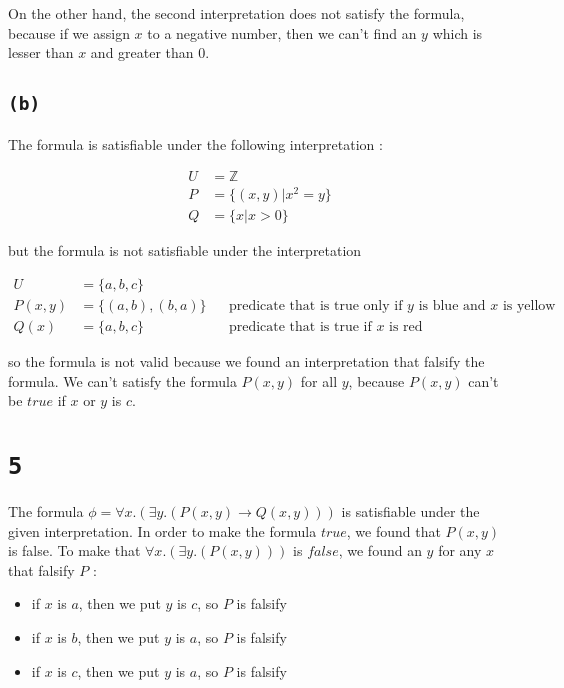 \documentclass[a4paper,11pt]{report}
\begin{document}
On the other hand, the second interpretation does not satisfy the formula,
because if we assign $x$ to a negative number, then we can't find an $y$ which
is lesser than $x$ and greater than $0$.

\subsection*{\texttt{(b)}}

The formula is satisfiable under the following interpretation :

\begin{align*}
  U &= \mathbb{Z} \\
  P &= \{(x,y) | x^2 = y\} \\
  Q &= \{x | x > 0\}
\end{align*}

but the formula is not satisfiable under the interpretation

\begin{align*}
  U &=  \{a,b,c\} && \text{} \\
  P(x,y) &= \{(a,b),(b,a)\} &&  \text{predicate that is true only if $y$ is blue and $x$ is yellow} \\
  Q(x)  &= \{a,b,c\} && \text{predicate that is true if $x$ is red}
\end{align*}

so the formula is not valid because we found an interpretation that falsify the
formula. We can't satisfy the formula $P(x,y)$ for all $y$, because $P(x,y)$ can't be
$true$ if $x$ or $y$ is $c$.

\section*{\texttt{5}}

The formula $\phi = \forall x.(\exists y.(P(x,y) \to Q(x,y)))$ is satisfiable
under the given interpretation. In order to make the formula $true$, we found
that $P(x,y)$ is false. To make that $\forall x.(\exists y.(P(x,y)))$ is
$false$, we found an $y$ for any $x$ that falsify $P$ :

\begin{itemize}
\item if $x$ is $a$, then we put $y$ is $c$, so $P$ is falsify
\item if $x$ is $b$, then we put $y$ is $a$, so $P$ is falsify
\item if $x$ is $c$, then we put $y$ is $a$, so $P$ is falsify
\end{itemize}
\end{document}
